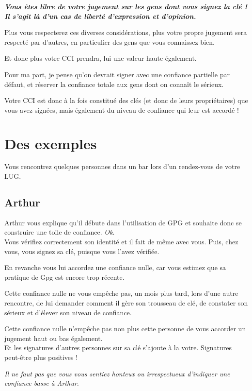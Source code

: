 \textbf{\emph{Vous êtes libre de votre jugement sur les gens dont vous
signez la clé ! Il s'agit là d'un cas de liberté d'expression et
d'opinion.}}

Plus vous respecterez ces diverses considérations, plus votre propre
jugement sera respecté par d'autres, en particulier des gens que vous
connaissez bien.

Et donc plus votre CCI prendra, lui une valeur haute également.

Pour ma part, je pense qu'on devrait signer avec une confiance partielle
par défaut, et réserver la confiance totale aux gens dont on connaît le
sérieux.

Votre CCI est donc à la fois constitué des clés (et donc de leurs
propriétaires) que vous avez signées, mais également du niveau de
confiance qui leur est accordé !

\section{Des exemples}\label{des-exemples}

Vous rencontrez quelques personnes dans un bar lors d'un rendez-vous de
votre LUG.

\subsection{Arthur}\label{arthur}

Arthur vous explique qu'il débute dans l'utilisation de GPG et souhaite
donc se construire une toile de confiance. \emph{Ok}.\\Vous vérifiez
correctement son identité et il fait de même avec vous. Puis, chez vous,
vous signez sa clé, puisque vous l'avez vérifiée.

En revanche vous lui accordez une confiance nulle, car vous estimez que
sa pratique de Gpg est encore trop récente.

Cette confiance nulle ne vous empêche pas, un mois plus tard, lors d'une
autre rencontre, de lui demander comment il gère son trousseau de clé,
de constater son sérieux et d'élever son niveau de confiance.

Cette confiance nulle n'empêche pas non plus cette personne de vous
accorder un jugement haut ou bas également.\\Et les signatures d'autres
personnes sur sa clé s'ajoute à la votre. Signatures peut-être plus
positives !

\emph{Il ne faut pas que vous vous sentiez honteux ou irrespectueux
d'indiquer une confiance basse à Arthur.}

